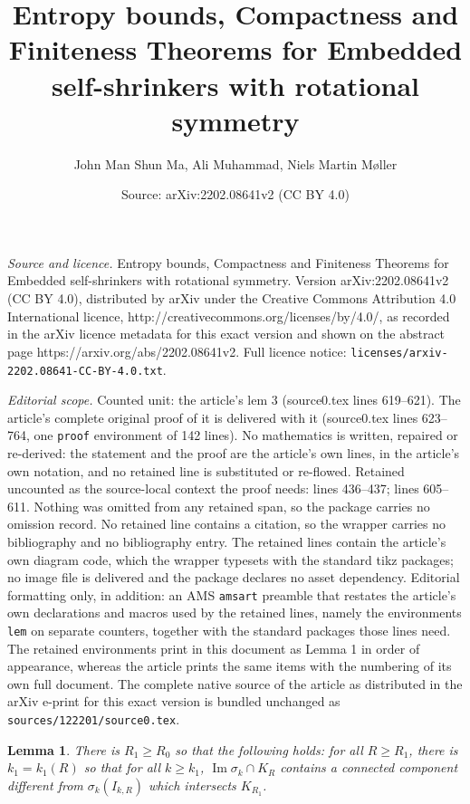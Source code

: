 \documentclass[10pt,a4paper]{amsart}
\title{Entropy bounds, Compactness and Finiteness Theorems for Embedded self-shrinkers with rotational symmetry}
\author{John Man Shun Ma, Ali Muhammad, Niels Martin M\o ller}
\date{Source: arXiv:2202.08641v2 (CC BY 4.0)}
\newtheorem{lem}{Lemma}
\begin{document}
\maketitle

\noindent\emph{Source and licence.} Entropy bounds, Compactness and Finiteness Theorems for Embedded self-shrinkers with rotational symmetry. Version arXiv:2202.08641v2 (CC BY 4.0), distributed by arXiv under the Creative Commons Attribution 4.0 International licence, http://creativecommons.org/licenses/by/4.0/, as recorded in the arXiv licence metadata for this exact version and shown on the abstract page https://arxiv.org/abs/2202.08641v2. Full licence notice: \texttt{licenses/arxiv-2202.08641-CC-BY-4.0.txt}.\par\smallskip

\noindent\textit{Editorial scope.} Counted unit: the article's lem 3 (source0.tex lines 619--621). The article's complete original proof of it is delivered with it (source0.tex lines 623--764, one \texttt{proof} environment of 142 lines). No mathematics is written, repaired or re-derived: the statement and the proof are the article's own lines, in the article's own notation, and no retained line is substituted or re-flowed.  Retained uncounted as the source-local context the proof needs: lines 436--437; lines 605--611.  Nothing was omitted from any retained span, so the package carries no omission record.  No retained line contains a citation, so the wrapper carries no bibliography and no bibliography entry.  The retained lines contain the article's own diagram code, which the wrapper typesets with the standard tikz packages; no image file is delivered and the package declares no asset dependency.  Editorial formatting only, in addition: an AMS \texttt{amsart} preamble that restates the article's own declarations and macros used by the retained lines, namely the environments \texttt{lem} on separate counters, together with the standard packages those lines need.  The retained environments print in this document as Lemma 1 in order of appearance, whereas the article prints the same items with the numbering of its own full document.  The complete native source of the article as distributed in the arXiv e-print for this exact version is bundled unchanged as \texttt{sources/122201/source0.tex}.
		\begin{lem} \label{claim 1} There is $R_1 \ge R_0$ so that the following holds: for all $R \ge R_1$, there is $k_1 = k_1(R)$ so that for all $k\ge k_1$, $\operatorname{Im}\sigma_k\cap K_R$ contains a connected component different from $\sigma_k (I_{k,R})$ which intersects $K_{R_1}$. 
		\end{lem}
\end{document}
